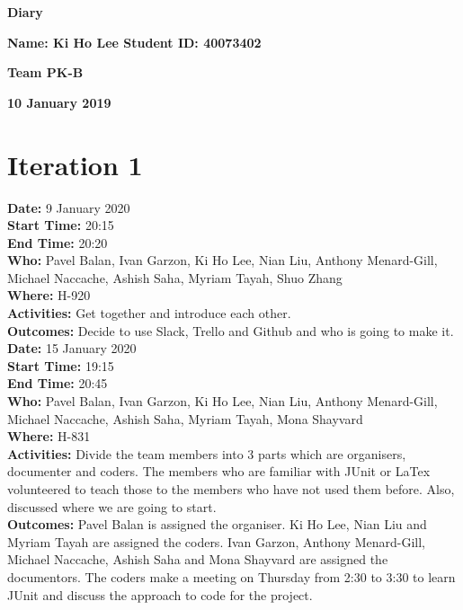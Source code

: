 \documentclass[12pt]{article}
\begin{document}
\vspace*{0.2in}
\centerline{\bf\Large Diary}

\vspace*{0.2in}
\centerline{\bf\Large Name: Ki Ho Lee   Student ID: 40073402}

\vspace*{0.2in}
\centerline{\bf\Large Team PK-B}

\vspace*{0.2in}
\centerline{\bf\Large 10 January 2019}

\section{Iteration 1}

{\bf Date:} 9 January 2020\\
{\bf Start Time:} 20:15\\
{\bf End Time:} 20:20 \\
{\bf Who:} Pavel Balan, Ivan Garzon, Ki Ho Lee, Nian Liu, Anthony Menard-Gill, Michael Naccache, Ashish Saha, Myriam Tayah, Shuo Zhang\\
{\bf Where:} H-920 \\
{\bf Activities:} Get together and introduce each other.\\
{\bf Outcomes:} Decide to use Slack, Trello and Github and who is going to make it.\\

{\bf Date:} 15 January 2020\\
{\bf Start Time:} 19:15\\
{\bf End Time:} 20:45 \\
{\bf Who:} Pavel Balan, Ivan Garzon, Ki Ho Lee, Nian Liu, Anthony Menard-Gill, Michael Naccache, Ashish Saha, Myriam Tayah, Mona Shayvard\\
{\bf Where:} H-831 \\
{\bf Activities:} Divide the team members into 3 parts which are organisers, documenter and coders. The members who are familiar with JUnit or LaTex volunteered to teach those to the members who have not used them before. Also, discussed where we are going to start.\\
{\bf Outcomes:} Pavel Balan is assigned the organiser. Ki Ho Lee, Nian Liu and Myriam Tayah are assigned the coders. Ivan Garzon, Anthony Menard-Gill, Michael Naccache, Ashish Saha and Mona Shayvard are assigned the documentors. The coders make a meeting on Thursday from 2:30 to 3:30 to learn JUnit and discuss the approach to code for the project.\\
\end{document}
